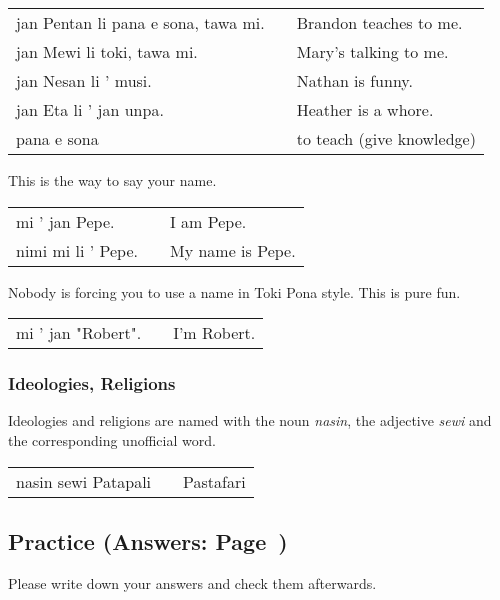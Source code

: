 \begin{supertabular}{p{5,5cm}|ll}
jan Pentan li pana e sona, tawa mi. && Brandon teaches to me. \\
jan Mewi li toki, tawa mi. && Mary's talking to me. \\
jan Nesan li ' musi. && Nathan is funny. \\
jan Eta li ' jan unpa. && Heather is a whore. \\
pana e sona && to teach (give knowledge) \\
\end{supertabular} 

This is the way to say your name. 

\begin{supertabular}{p{5,5cm}|ll}
mi ' jan Pepe. && I am Pepe. \\
nimi mi li ' Pepe. && My name is Pepe. 
\end{supertabular} 

Nobody is forcing you to use a name in Toki Pona style.
This is pure fun.

\begin{supertabular}{p{5,5cm}|ll}
mi ' jan "Robert". && I'm Robert. \\
\end{supertabular} 

%
\subsubsection*{Ideologies, Religions}
%

Ideologies and religions are named with the noun \textit{nasin}, the adjective \textit{sewi} and the corresponding unofficial word. 

\begin{supertabular}{p{5,5cm}|ll}
nasin sewi Patapali && Pastafari \\
\end{supertabular}

%
\newpage
\subsection*{Practice (Answers: Page~\pageref{'unofficial_words'})}
%
Please write down your answers and check them afterwards. 

